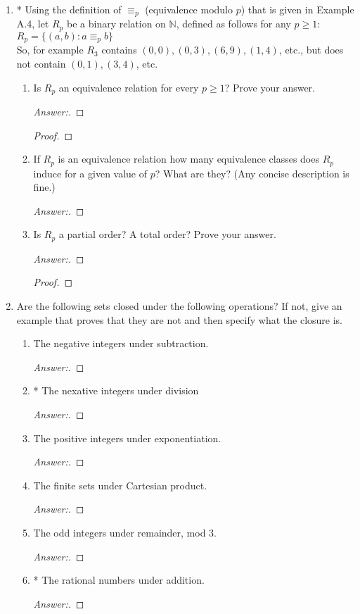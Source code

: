\documentclass[10pt]{article}
\newcommand{\nat}{\mathbb{N}}
\begin{document}
\begin{enumerate}
\addtocounter{enumi}{1}
\item
* Using the definition of $\equiv _p$ (equivalence modulo $p$) that is given in Example A.4, let $R_p$ be a binary relation on $\nat$, defined as follows for any $p \geq 1$: \\
$R_p = \{(a, b): a \equiv _p b \}$ \\
So, for example $R_3$ contains $(0, 0), (0, 3), (6, 9), (1, 4)$, etc., but does not contain $(0, 1), (3, 4)$, etc.
\begin{enumerate}
\item
Is $R_p$ an equivalence relation for every $p \geq 1$? Prove your answer.
\begin{proof}[Answer:]
\end{proof}
\begin{proof}
\end{proof}
\item
If $R_p$ is an equivalence relation how many equivalence classes does $R_p$ induce for a given value of $p$? What are they?  (Any concise description is fine.)
\begin{proof}[Answer:]
\end{proof}
\item
Is $R_p$ a partial order?  A total order?  Prove your answer.
\begin{proof}[Answer:]
\end{proof}
\begin{proof}
\end{proof}
\end{enumerate}



\addtocounter{enumi}{1}
\item
Are the following sets closed under the following operations?  If not, give an example that proves that they are not and then specify what the closure is.
\begin{enumerate}
\item
The negative integers under subtraction.
\begin{proof}[Answer:]
\end{proof}
\item
* The nexative integers under division
\begin{proof}[Answer:]
\end{proof}
\item
The positive integers under exponentiation.
\begin{proof}[Answer:]
\end{proof}
\item
The finite sets under Cartesian product.
\begin{proof}[Answer:]
\end{proof}
\item
The odd integers under remainder, mod 3.
\begin{proof}[Answer:]
\end{proof}
\item
* The rational numbers under addition.
\begin{proof}[Answer:]
\end{proof}
\end{enumerate}


\end{enumerate}
\end{document}
